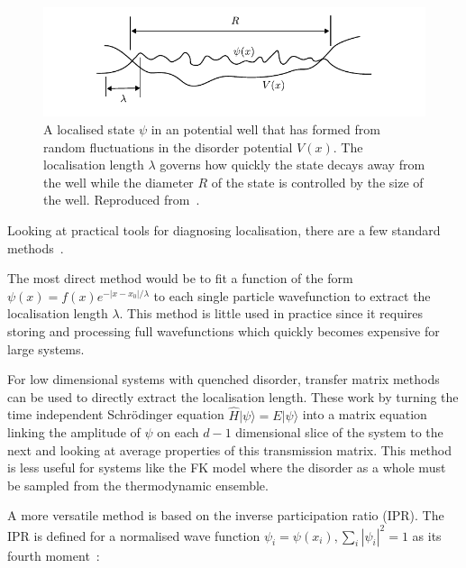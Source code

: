 \hypertarget{fig:localisation_radius_vs_length}{%
\begin{figure}
\centering
\includegraphics[width=1\textwidth,height=\textheight]{figure_code/background_chapter/localisation_radius_vs_length}
\caption[{Localisation length vs diameter}]{A localised state \(\psi\) in an potential well that has formed from random fluctuations in the disorder potential \(V(x)\). The localisation length \(\lambda\) governs how quickly the state decays away from the well while the diameter \(R\) of the state is controlled by the size of the well. Reproduced from~\autocite{kramerLocalizationTheoryExperiment1993}.}
\label{fig:localisation_radius_vs_length}
\end{figure}
}

Looking at practical tools for diagnosing localisation, there are a few standard methods~\autocite{kramerLocalizationTheoryExperiment1993}.

The most direct method would be to fit a function of the form \(\psi(x) = f(x) e^{-|x-x_0|/\lambda}\) to each single particle wavefunction to extract the localisation length \(\lambda\). This method is little used in practice since it requires storing and processing full wavefunctions which quickly becomes expensive for large systems.

For low dimensional systems with quenched disorder, transfer matrix methods can be used to directly extract the localisation length. These work by turning the time independent Schrödinger equation \(\hat{H}|\psi\rangle = E|\psi\rangle\) into a matrix equation linking the amplitude of \(\psi\) on each \(d-1\) dimensional slice of the system to the next and looking at average properties of this transmission matrix. This method is less useful for systems like the FK model where the disorder as a whole must be sampled from the thermodynamic ensemble.

A more versatile method is based on the inverse participation ratio (IPR). The IPR is defined for a normalised wave function \(\psi_i = \psi(x_i), \sum_i |\psi_i|^2 = 1\) as its fourth moment~\autocite{kramerLocalizationTheoryExperiment1993}:

